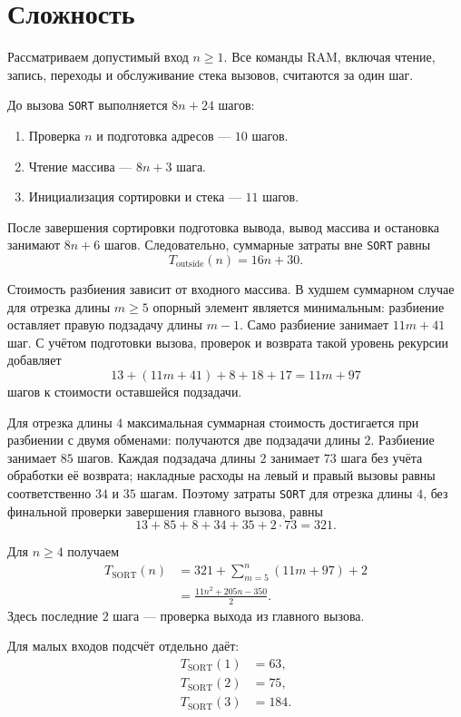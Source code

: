 \documentclass[12pt]{article}
\begin{document}
\section*{Сложность}

Рассматриваем допустимый вход $n\geq 1$. Все команды RAM, включая чтение, запись, переходы и обслуживание стека вызовов, считаются за один шаг.

До вызова \texttt{SORT} выполняется $8n+24$ шагов:
\begin{enumerate}
    \item Проверка $n$ и подготовка адресов — $10$ шагов.
    \item Чтение массива — $8n+3$ шага.
    \item Инициализация сортировки и стека — $11$ шагов.
\end{enumerate}

После завершения сортировки подготовка вывода, вывод массива и остановка занимают $8n+6$ шагов. Следовательно, суммарные затраты вне \texttt{SORT} равны
\[
    T_{\mathrm{outside}}(n)=16n+30.
\]

Стоимость разбиения зависит от входного массива. В худшем суммарном случае для отрезка длины $m\geq 5$ опорный элемент является минимальным: разбиение оставляет правую подзадачу длины $m-1$. Само разбиение занимает $11m+41$ шаг. С учётом подготовки вызова, проверок и возврата такой уровень рекурсии добавляет
\[
    13+(11m+41)+8+18+17=11m+97
\]
шагов к стоимости оставшейся подзадачи.

Для отрезка длины $4$ максимальная суммарная стоимость достигается при разбиении с двумя обменами: получаются две подзадачи длины $2$. Разбиение занимает $85$ шагов. Каждая подзадача длины $2$ занимает $73$ шага без учёта обработки её возврата; накладные расходы на левый и правый вызовы равны соответственно $34$ и $35$ шагам. Поэтому затраты \texttt{SORT} для отрезка длины $4$, без финальной проверки завершения главного вызова, равны
\[
    13+85+8+34+35+2\cdot73=321.
\]

Для $n\geq 4$ получаем
\[
\begin{aligned}
T_{\mathrm{SORT}}(n)
&=321+\sum_{m=5}^{n}(11m+97)+2\\
&=\frac{11n^2+205n-350}{2}.
\end{aligned}
\]
Здесь последние $2$ шага — проверка выхода из главного вызова.

Для малых входов подсчёт отдельно даёт:
\[
\begin{aligned}
T_{\mathrm{SORT}}(1)&=63,\\
T_{\mathrm{SORT}}(2)&=75,\\
T_{\mathrm{SORT}}(3)&=184.
\end{aligned}
\]
\end{document}
